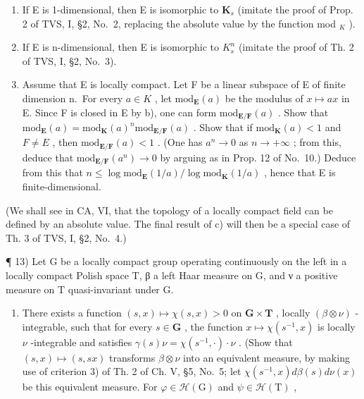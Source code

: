 \begin{enumerate}
\def\labelenumi{\alph{enumi})}
\item
  If E is 1-dimensional, then E is isomorphic to \(\mathbf{K}_s\) (imitate the proof of Prop. 2 of TVS, I, §2, No.~2, replacing the absolute value by the function mod \(_K\) ).
\item
  If E is n-dimensional, then E is isomorphic to \(K_{s}^{n}\) (imitate the proof of Th. 2 of TVS, I, §2, No.~3).
\item
  Assume that E is locally compact. Let F be a linear subspace of E of finite dimension n.~For every \(a \in K\) , let \(\text{mod}_{\mathbf{E}}(a)\) be the modulus of \(x \mapsto ax\) in E. Since F is closed in E by b), one can form \(\text{mod}_{\mathbf{E}/\mathbf{F}}(a)\) . Show that \(\text{mod}_{\mathbf{E}}(a) = \text{mod}_{\mathbf{K}}(a)^n \text{mod}_{\mathbf{E}/\mathbf{F}}(a)\) . Show that if \(\text{mod}_{\mathbf{K}}(a) < 1\) and \(F \neq E\) , then \(\text{mod}_{\mathbf{E}/\mathbf{F}}(a) < 1\) . (One has \(a^n \to 0\) as \(n \to +\infty\) ; from this, deduce that \(\text{mod}_{\mathbf{E}/\mathbf{F}}(a^n) \to 0\) by arguing as in Prop. 12 of No.~10.) Deduce from this that \(n \leqslant \log \text{mod}_{\mathbf{E}}(1/a)/\log \text{mod}_{\mathbf{K}}(1/a)\) , hence that E is finite-dimensional.
\end{enumerate}

(We shall see in CA, VI, that the topology of a locally compact field can be defined by an absolute value. The final result of c) will then be a special case of Th. 3 of TVS, I, §2, No.~4.)

¶ 13) Let G be a locally compact group operating continuously on the left in a locally compact Polish space T, β a left Haar measure on G, and ν a positive measure on T quasi-invariant under G.

\begin{enumerate}
\def\labelenumi{\alph{enumi})}
\tightlist
\item
  There exists a function \((s,x)\mapsto \chi (s,x) > 0\) on \(\mathbf{G}\times \mathbf{T}\) , locally \((\beta \otimes \nu)\) -integrable, such that for every \(s\in \mathbf{G}\) , the function \(x\mapsto \chi (s^{-1},x)\) is locally \(\nu\) -integrable and satisfies \(\gamma(s)\nu = \chi(s^{-1},\cdot)\cdot\nu\) . (Show that \((s,x)\mapsto(s,sx)\) transforms \(\beta\otimes\nu\) into an equivalent measure, by making use of criterion 3) of Th. 2 of Ch. V, §5, No.~5; let \(\chi(s^{-1},x)d\beta(s)d\nu(x)\) be this equivalent measure. For \(\varphi\in\mathcal{H}(\mathrm{G})\) and \(\psi\in\mathcal{H}(\mathrm{T})\) ,
\end{enumerate}

